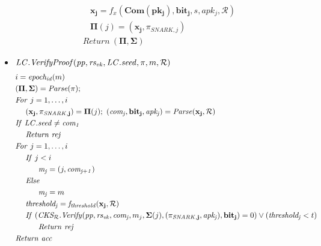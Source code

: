 \begin{itemize}
\begin{align*}
&\ \ \ \ \ \ \ \ \mathbf{x_j} = f_x(\mathbf{Com}(\mathbf{pk_j}), \mathbf{bit_j}, s,  \mathit{apk_{j}}, \mathcal{R}) \\
&\ \ \ \ \ \ \ \ \mathbf{\Pi}(j) = (\mathbf{x_j}, \mathit{\pi_{\mathit{SNARK}, j}}) \\
&\ \ \ \ \mathit{Return} \ (\mathbf{\Pi}, \mathbf{\Sigma})  
\end{align*}
\end{itemize}
\begin{itemize}
\item $\mathit{LC.VerifyProof}(\mathit{pp}, \mathit{rs_{\mathit{vk}}}, \mathit{LC.seed}, \pi, m, \mathcal{R})$
\begin{align*}
& i = \mathit{epoch_{id}}(m) \\
& (\mathbf{\Pi}, \mathbf{\Sigma}) = \mathit{Parse}(\pi);  \\
& \mathit{For} \ j = 1, \ldots, i \\
& \ \ \ \ (\mathbf{x_j}, \mathbf{\pi_{\mathit{SNARK},j}}) = \mathbf{\Pi}(j); \ (\mathit{com_j}, \mathbf{bit_j}, \mathit{apk_j}) = \mathit{Parse}(\mathbf{x_j}, \mathcal{R}) \\
& \mathit{If} \ \mathit{LC.seed} \neq \mathit{com_1} \\
& \ \ \ \ \mathit{Return} \ \mathit{rej} \\
& \mathit{For} \ j = 1, \ldots, i \\
& \ \ \ \ \mathit{If} \ j < i\\
& \ \ \ \ \ \ \ \ \ \mathit{m_j} = (j, \mathit{com_{j+1}}) \\
& \ \ \ \ \mathit{Else}\\
& \ \ \ \ \ \ \ \ \ \mathit{m_j} = m \\
& \ \ \ \ \mathit{threshold_j} = \mathit{f_{\mathit{threshold}}}(\mathbf{x_j}, \mathcal{R})  \\
& \ \ \ \ \mathit{If} \ (\mathit{CKS_{\mathcal{R}}.Verify}(\mathit{pp},  \mathit{rs_{\mathit{vk}}}, \mathit{com_j}, m_j,  \mathbf{\Sigma}(j), (\mathbf{\pi_{\mathit{SNARK},j}},\mathit{apk_j}), 
\mathbf{bit_j}) = 0)  \vee (\mathit{threshold_j} < t) \\
& \ \ \ \ \ \ \ \ \ \mathit{Return} \ \mathit{rej} \\
& \mathit{Return} \ \mathit{acc} \\
\end{align*}
\end{itemize}
